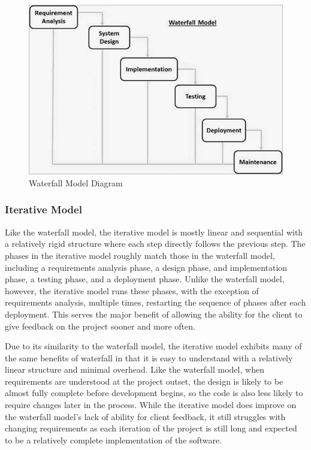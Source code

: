 \begin{figure}[htb]
    \centering
    \includegraphics[width=.75\textwidth]{02_dev_process/res/sdlc_waterfall_model.jpg}
    \caption[Waterfall Model Diagram]{Waterfall Model Diagram}
\end{figure}

\subsubsection{Iterative Model}
Like the waterfall model, the iterative model is mostly linear and sequential with a relatively rigid structure where each step directly follows the previous step. The phases in the iterative model roughly match those in the waterfall model, including a requirements analysis phase, a design phase, and implementation phase, a testing phase, and a deployment phase. Unlike the waterfall model, however, the iterative model runs these phases, with the exception of requirements analysis, multiple times, restarting the sequence of phases after each deployment. This serves the major benefit of allowing the ability for the client to give feedback on the project sooner and more often.

Due to its similarity to the waterfall model, the iterative model exhibits many of the same benefits of waterfall in that it is easy to understand with a relatively linear structure and minimal overhead. Like the waterfall model, when requirements are understood at the project outset, the design is likely to be almost fully complete before development begins, so the code is also less likely to require changes later in the process. While the iterative model does improve on the waterfall model's lack of ability for client feedback, it still struggles with changing requirements as each iteration of the project is still long and expected to be a relatively complete implementation of the software.


